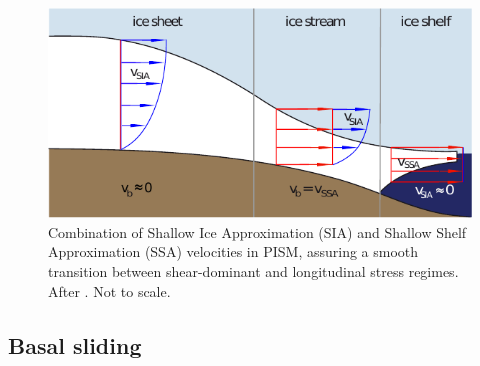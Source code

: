 \documentclass[a4paper]{kappa}
\begin{document}
\begin{figure}
  \includegraphics{model-siassa}
  \caption{Combination of Shallow Ice Approximation (SIA) and Shallow Shelf
           Approximation (SSA) velocities in PISM, assuring a smooth transition
           between shear-dominant and longitudinal stress regimes. After
           \citet[Fig.~1]{Winkelmann.etal.2011}. Not to scale.}
  \label{fig:model-siassa}
\end{figure}


\subsection{Basal sliding}
\end{document}
